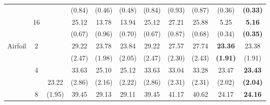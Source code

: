 \documentclass[letterpaper]{article} %
\begin{document}
\begin{table}[!t]
{\begin{tabular}{clcccccccc|cc}
\multicolumn{2}{c}{}                             &                       &                             & (0.84)                    & (0.46)                    & (0.48)                      & (0.84)                    & (0.93)                    & (0.87)                      & (0.36)              & \textbf{(0.33)}       \\
\multicolumn{2}{c}{}                             & \multirow{2}{*}{16}   &                             & 25.12                     & 13.78                     & 13.94                       & 25.12                     & 27.21                     & 25.88                       & 5.25                & \textbf{5.16}         \\
\multicolumn{2}{c}{}                             &                       &                             & (0.67)                    & (0.96)                    & (0.70)                      & (0.67)                    & (0.87)                    & (0.68)                      & (0.34)              & \textbf{(0.35)}       \\ \hline
\multicolumn{2}{c}{\multirow{8}{*}{Airfoil}}     & \multirow{2}{*}{2}    &                             & 29.22                     & 23.78                     & 23.84                       & 29.22                     & 27.57                     & 27.74                       & \textbf{23.36}      & 23.38                 \\
\multicolumn{2}{c}{}                             &                       &                             & (2.47)                    & (1.98)                    & (2.05)                      & (2.47)                    & (2.30)                    & (2.43)                      & \textbf{(1.91)}     & (1.91)                \\
\multicolumn{2}{c}{}                             & \multirow{2}{*}{4}    &                             & 33.63                     & 25.10                     & 25.12                       & 33.63                     & 33.04                     & 33.28                       & 23.47               & \textbf{23.43}        \\
\multicolumn{2}{c}{}                             &                       & 23.22                       & (2.86)                    & (2.16)                    & (2.22)                      & (2.86)                    & (2.31)                    & (2.31)                      & (2.02)              & \textbf{(2.04)}       \\
\multicolumn{2}{c}{}                             & \multirow{2}{*}{8}    & (1.95)                      & 39.45                     & 29.13                     & 29.11                       & 39.45                     & 41.17                     & 40.62                       & 24.17               & \textbf{24.16}        \\

\end{tabular}}
\end{table}
\end{document}
